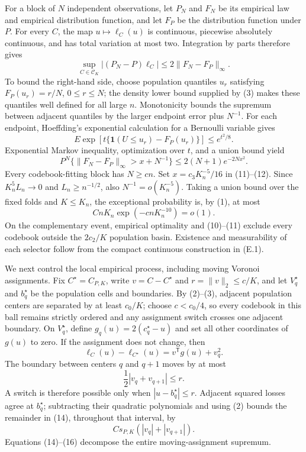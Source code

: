 For a block of \(N\) independent observations, let \(P_N\) and \(F_N\) be its empirical law and empirical distribution function, and let \(F_P\) be the distribution function under \(P\).  For every \(C\), the map \(u\mapsto\ell_C(u)\) is continuous, piecewise absolutely continuous, and has total variation at most two.  Integration by parts therefore gives
\[
 \sup_{C\in\mathcal C_K}|(P_N-P)\ell_C|\leq2\|F_N-F_P\|_\infty.            \tag{11}
\]
To bound the right-hand side, choose population quantiles \(u_r\) satisfying \(F_P(u_r)=r/N\), \(0\leq r\leq N\); the density lower bound supplied by (3) makes these quantiles well defined for all large \(n\).  Monotonicity bounds the supremum between adjacent quantiles by the larger endpoint error plus \(N^{-1}\).  For each endpoint, Hoeffding's exponential calculation for a Bernoulli variable gives
\[
 E\exp[t\{\mathbf1(U\leq u_r)-F_P(u_r)\}]\leq e^{t^2/8}.
\]
Exponential Markov inequality, optimization over \(t\), and a union bound yield
\[
 P^N\{\|F_N-F_P\|_\infty>x+N^{-1}\}\leq2(N+1)e^{-2Nx^2}.                  \tag{12}
\]
Every codebook-fitting block has \(N\geq cn\).  Set \(x=c_3K_n^{-5}/16\) in (11)--(12).  Since \(K_n^5L_n\to0\) and \(L_n\geq n^{-1/2}\), also \(N^{-1}=o(K_n^{-5})\).  Taking a union bound over the fixed folds and \(K\leq K_n\), the exceptional probability is, by (1), at most
\[
 CnK_n\exp(-cnK_n^{-10})=o(1).                                               \tag{13}
\]
On the complementary event, empirical optimality and (10)--(11) exclude every codebook outside the \(2c_2/K\) population basin.  Existence and measurability of each selector follow from the compact continuous construction in (E.1).

We next control the local empirical process, including moving Voronoi assignments.  Fix \(C^\star=C_{P,K}\), write \(v=C-C^\star\) and \(r=\|v\|_2\leq c/K\), and let \(V_q^\star\) and \(b_q^\star\) be the population cells and boundaries.  By (2)--(3), adjacent population centers are separated by at least \(c_0/K\); choose \(c<c_0/4\), so every codebook in this ball remains strictly ordered and any assignment switch crosses one adjacent boundary.  On \(V_q^\star\), define \(g_q(u)=2(c_q^\star-u)\) and set all other coordinates of \(g(u)\) to zero.  If the assignment does not change, then
\[
 \ell_C(u)-\ell_{C^\star}(u)=v^{\mathsf T}g(u)+v_q^2.                       \tag{14}
\]
The boundary between centers \(q\) and \(q+1\) moves by at most
\[
 \frac12|v_q+v_{q+1}|\leq r.                                                 \tag{15}
\]
A switch is therefore possible only when \(|u-b_q^\star|\leq r\).  Adjacent squared losses agree at \(b_q^\star\); subtracting their quadratic polynomials and using (2) bounds the remainder in (14), throughout that interval, by
\[
 Cs_{P,K}(|v_q|+|v_{q+1}|).                                                   \tag{16}
\]
Equations (14)--(16) decompose the entire moving-assignment supremum.

